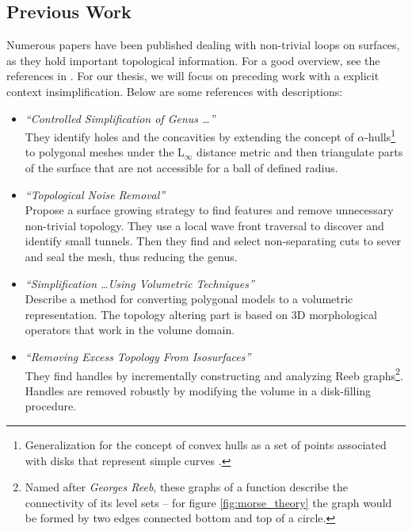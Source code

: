 \subsection{Previous Work}
\label{math_loop_previous_work}

Numerous papers have been published dealing with non-trivial loops on surfaces, as they hold important topological information.
For a good overview, see the references in \citep[][especially section 2]{Ni2004}.
For our thesis, we will focus on preceding work with a explicit context insimplification.
Below are some references with descriptions:
\begin{itemize}
	\item \citep[][]{El-Sana1997} \textit{``Controlled Simplification of Genus \dots''}\\
They identify holes and the concavities by extending the concept of $\alpha$-hulls\footnote{ Generalization for the concept of convex hulls as a set of points associated with disks that represent simple curves \citep[introduced by][]{Edelsbrunner1983}.} to polygonal meshes under the $\mathrm{L}_{\infty}$ distance metric and then triangulate parts of the surface that are not accessible for a ball of defined radius.
	\item \citep[][]{Guskov2001} \textit{``Topological Noise Removal''}\\
Propose a surface growing strategy to find features and remove unnecessary non-trivial topology. They use a local wave front traversal to discover and identify small tunnels. Then they find and select non-separating cuts to sever and seal the mesh, thus reducing the genus.
	\item \citep[][]{Nooruddin2003} \textit{``Simplification \dots Using Volumetric Techniques''}\\
Describe a method for converting polygonal models to a volumetric representation. The topology altering part is based on 3D morphological operators that work in the volume domain.
	\item \citep[][]{Wood2004} \textit{``Removing Excess Topology From Isosurfaces''}\\
They find handles by incrementally constructing and analyzing Reeb graphs\footnote{ Named after \textit{Georges Reeb}, these graphs of a function describe the connectivity of its level sets -- for figure \ref{fig:morse_theory} the graph would be formed by two edges connected bottom and top of a circle.}. Handles are removed robustly by modifying the volume in a disk-filling procedure.

\end{itemize}
